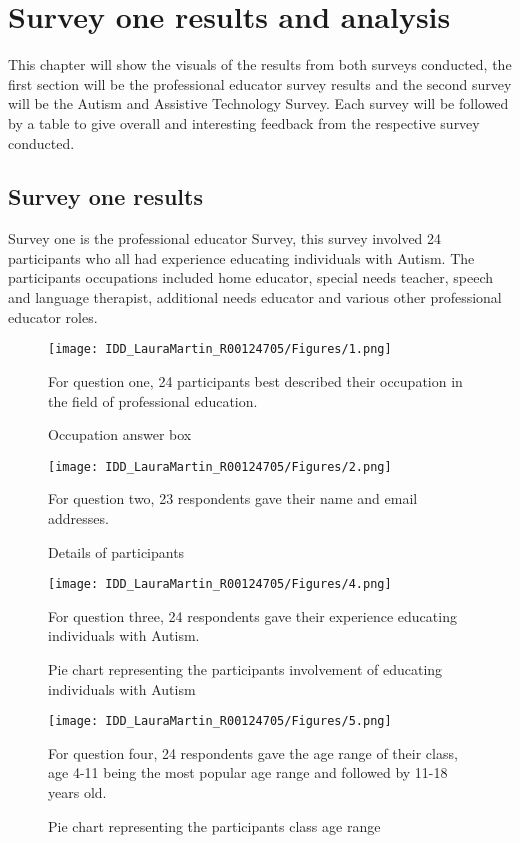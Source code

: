 \chapter{Survey one results and analysis}
\label{chap:Survey one results and analysis}
This chapter will show the visuals of the results from both surveys conducted, the first section will be the professional educator survey results and the second survey will be the Autism and Assistive Technology Survey. Each survey will be followed by a table to give overall and interesting feedback from the respective survey conducted.

\section{Survey one results}

Survey one  is the professional educator Survey, this survey involved 24 participants who all had experience educating individuals with Autism. The participants occupations included home educator, special needs teacher, speech and language therapist, additional needs educator and various other professional educator roles.

\begin{figure}[ht]
\centering
\texttt{[image: IDD\_LauraMartin\_R00124705/Figures/1.png]}
\caption{Occupation answer box }
{For question one, 24 participants best described their occupation in the field of professional education.}
\end{figure}

\begin{figure}[ht]
\centering
\texttt{[image: IDD\_LauraMartin\_R00124705/Figures/2.png]}
\caption{Details of participants}
{For question two, 23 respondents gave their name and email addresses.}
\end{figure}

\begin{figure}[ht]
\centering
\texttt{[image: IDD\_LauraMartin\_R00124705/Figures/4.png]}
\caption{Pie chart representing the participants involvement of educating individuals with Autism}
{For question three, 24 respondents gave their experience educating individuals with Autism.}
\end{figure}

\begin{figure}[ht]
\centering
\texttt{[image: IDD\_LauraMartin\_R00124705/Figures/5.png]}
\caption{Pie chart representing the participants class age range}
{For question four, 24 respondents gave the age range of their class, age 4-11 being the most popular age range and followed by 11-18 years old.}
\end{figure}

